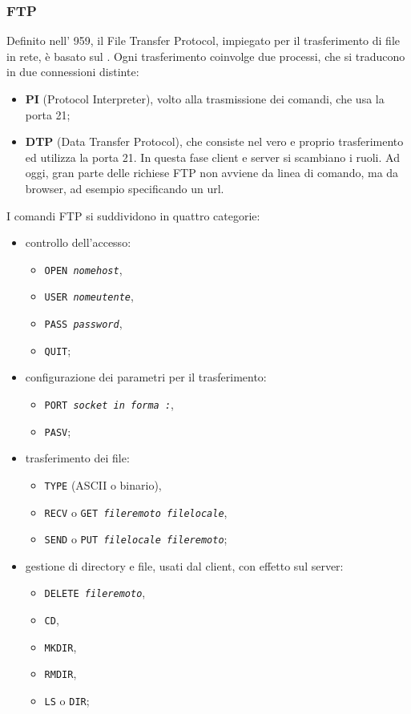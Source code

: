 \documentclass[a4paper,11pt]{article}
\def\code#1{\texttt{#1}}
\def\subsub#1{\subsubsection{#1}\label{#1}}
\def\vedi#1{\nameref{#1}}
\def\italic#1{\textit{#1}}
\begin{document}
\subsub{FTP}
Definito nell'\vedi{RFC} 959, il File Transfer Protocol, impiegato per il trasferimento di file in rete, è basato sul \vedi{TCP}. Ogni trasferimento coinvolge due processi, che si traducono in due connessioni distinte:
\begin{itemize}
\item \textbf{PI} (Protocol Interpreter), volto alla trasmissione dei comandi, che usa la porta 21; 
\item \textbf{DTP} (Data Transfer Protocol), che consiste nel vero e proprio trasferimento ed utilizza la porta 21. In questa fase client e server si scambiano i ruoli. Ad oggi, gran parte delle richiese FTP non avviene da linea di comando, ma da browser, ad esempio specificando un url.
\end{itemize}
I comandi FTP si suddividono in quattro categorie:
\begin{itemize}
\item controllo dell'accesso:
	\begin{itemize}
	\item \code{OPEN \italic{nomehost}},
	\item \code{USER \italic{nomeutente}},
	\item \code{PASS \italic{password}},
	\item \code{QUIT};
	\end{itemize}
\item configurazione dei parametri per il trasferimento:
	\begin{itemize}
	\item \code{PORT \italic{socket in forma \vedi{IP}:\vedi{Porta}}},
	\item \code{PASV};
	\end{itemize}
\item trasferimento dei file:	
	\begin{itemize}
		\item \code{TYPE} (ASCII o binario),
		\item \code{RECV} o \code{GET \italic{fileremoto filelocale}},
		\item \code{SEND} o \code{PUT \italic{filelocale fileremoto}};
	\end{itemize}
\item gestione di directory e file, usati dal client, con effetto sul server:
	\begin{itemize}
		\item \code{DELETE \italic{fileremoto}},
		\item \code{CD},
		\item \code{MKDIR},
		\item \code{RMDIR},
		\item \code{LS} o \code{DIR};
	\end{itemize}
\end{itemize}
\end{document}
